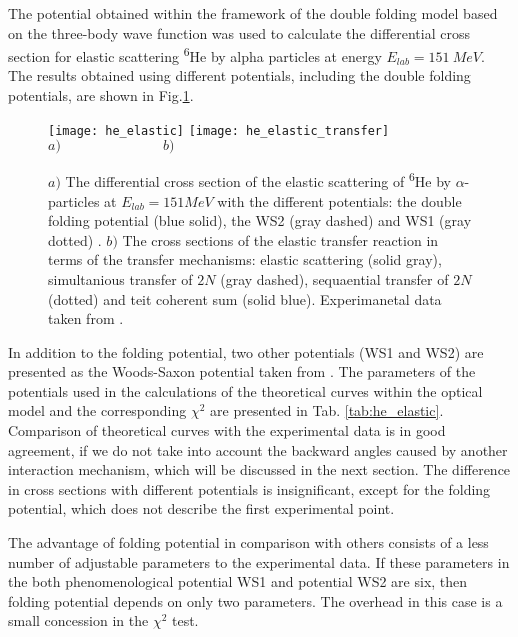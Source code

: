 \documentclass[
12pt, %
oneside, %
english, %
onehalfspacing, %
onehalfspacing, %
headsepline, %
]{MastersDoctoralThesis} %
\newcommand{\he}{\textsuperscript{6}He\xspace}
\begin{document}
The potential obtained within the framework of the double folding model based on the three-body wave function was used to calculate the differential cross section for elastic scattering \he by alpha particles at energy $ E_{lab} = 151~MeV $. 
The results obtained using different potentials, including the double folding potentials, are shown in Fig.\ref{he_elastic}. 

\begin{figure}
\centering
\texttt{[image: he\_elastic]}
\texttt{[image: he\_elastic\_transfer]}
$a)~~~~~~~~~~~~~~~~~~~~~~~~~~~~~~~~~b)$
\decoRule
\caption{  \footnotesize  $a)$ The differential cross section of the elastic scattering of \he by $\alpha$-particles at $E_{lab}=151MeV$ with the different potentials: the double folding potential (blue solid), the WS2  (gray dashed) \cite{oganessian1999dynamics} and  WS1 (gray dotted) \cite{oganessian1999dynamics}. $b)$ The cross sections of the elastic transfer reaction in terms of the transfer mechanisms: elastic scattering (solid gray), simultanious transfer of $2N$ (gray dashed), sequaential transfer of $2N$ (dotted) and teit coherent sum (solid blue). Experimanetal data taken from \cite{oganessian1999dynamics}.
}
\label{he_elastic}
\end{figure}

In addition to the folding potential, two other potentials (WS1 and WS2) are presented as the Woods-Saxon potential taken from \cite{oganessian1999dynamics}. The parameters of the potentials used in the calculations of the theoretical curves within the optical model and the corresponding $ \chi^2 $ are presented in Tab. \ref{tab:he_elastic}.
Comparison of theoretical curves with the experimental data is in good agreement, if we do not take into account the backward angles caused by another interaction mechanism, which will be discussed in the next section. The difference in cross sections with different potentials is insignificant, except for the folding potential, which does not describe the first experimental point. 

The advantage of folding potential in comparison with others consists of a less number of adjustable parameters to the experimental data. If these parameters in the  both phenomenological potential WS1 and potential WS2 are six, then folding potential depends on only two parameters. The overhead in this case is a small concession in the $ \chi^2$ test.
\end{document}
